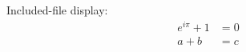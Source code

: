 Included-file display:
\begin{equation}
  \begin{split}
    e^{i\pi}+1 &= 0 \\
    a+b &= c
  \end{split}
\end{equation}
